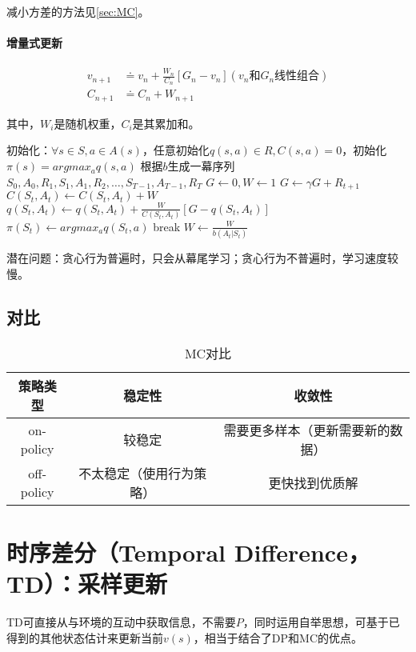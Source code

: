 \documentclass[
12pt, %
a4paper, 
oneside, %
headinclude,footinclude, %
]{scrartcl}
\begin{document}
减小方差的方法见\ref{sec:MC}。
\paragraph{增量式更新}
\begin{align*}
v_{n + 1} &\doteq v_n + \frac{W_n}{C_n}[G_n - v_n] (v_n \text{和} G_n \text{线性组合}) \\
C_{n + 1} &\doteq C_n + W_{n + 1}
\end{align*}

其中，$ W_i $是随机权重，$ C_i $是其累加和。
\begin{myalgorithm}
\State 初始化：$ \forall s \in S, a \in A(s) $，任意初始化$ q(s,a) \in R, C(s,a) = 0 $，初始化$ \pi(s) = argmax_a q(s,a) $ 
\Loop
\State 根据$ b $生成一幕序列$ S_0, A_0, R_1, S_1, A_1, R_2, \dots, S_{T - 1}, A_{T - 1}, R_T $ 
\State $ G \gets 0, W \gets 1 $
\State $ G \gets \gamma G + R_{t + 1} $
\State $ C(S_t, A_t) \gets C(S_t, A_t) + W $
\State $ q(S_t ,A_t) \gets q(S_t, A_t) + \frac{W}{C(S_t, A_t)}[G - q(S_t, A_t)] $ 
\State $ \pi(S_t) \gets argmax_a q(S_t,a) $
\State break 
\EndIf
\State $ W \gets \frac{W}{b(A_t|S_t)} $ 
\EndFor
\EndLoop
\end{myalgorithm}

潜在问题：贪心行为普遍时，只会从幕尾学习；贪心行为不普遍时，学习速度较慢。
\subsection[对比]{对比}
\begin{table}[H]
\centering
\begin{tabular}{|c|c|c|}
\hline
策略类型 & 稳定性 & 收敛性 \\
\hline
on-policy & 较稳定 & 需要更多样本（更新需要新的数据） \\
\hline
off-policy & 不太稳定（使用行为策略） & 更快找到优质解 \\
\hline
\end{tabular}
\caption{MC对比}
\end{table}
\section[时序差分]{时序差分（Temporal Difference，TD）：采样更新}
TD可直接从与环境的互动中获取信息，不需要$ P $，同时运用自举思想，可基于已得到的其他状态估计来更新当前$ v(s) $，相当于结合了DP和MC的优点。
\end{document}
